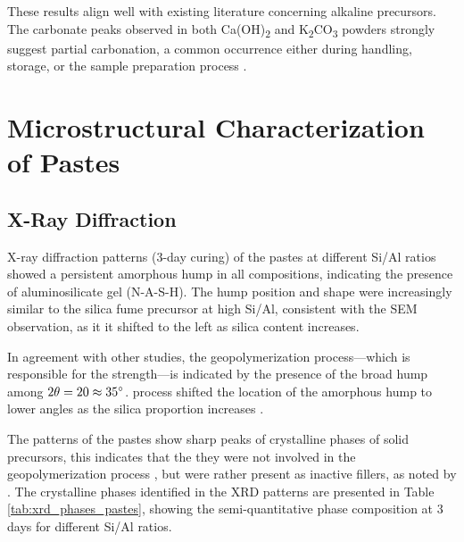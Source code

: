  These results align well with existing literature concerning alkaline precursors. The carbonate peaks observed in both Ca(OH)\textsubscript{2} and K\textsubscript{2}CO\textsubscript{3} powders strongly suggest partial carbonation, a common occurrence either during handling, storage, or the sample preparation process \cite{Lei2021}.



\section{Microstructural Characterization of Pastes}

\subsection{X-Ray Diffraction}

X-ray diffraction patterns (3-day curing) of the pastes at different Si/Al ratios showed a persistent amorphous hump in all compositions, indicating the presence of aluminosilicate gel (N-A-S-H).
The hump position and shape were increasingly similar to the silica fume precursor at high Si/Al, consistent with the SEM observation, as it it shifted to the left as silica content increases. 

In agreement with other studies, the geopolymerization process—which is responsible for the strength—is indicated by the presence of the broad hump among $2\theta = 20 \approx 35^{\circ}$.
process shifted the location of the amorphous hump to lower angles as the silica proportion increases \cite{arellano2014geopolymer,lee2017strength, wan2017geopolymerization}.

The patterns of the pastes show sharp peaks of crystalline phases of solid precursors, this indicates that the they were not involved in the geopolymerization process \cite{Geraldo2020}, but were rather present as inactive fillers, as noted by \cite{ruiz2012alkaline}.
The crystalline phases identified in the XRD patterns are presented in Table \ref{tab:xrd_phases_pastes}, showing the semi-quantitative phase composition at 3 days for different Si/Al ratios.

